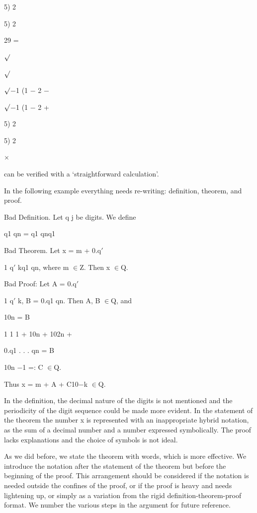 \documentclass[11pt]{article}
\theoremstyle{plain}
\theoremstyle{definition}
\begin{document}
5) 2

5) 2

29 =

$\surd$

$\surd$

$\surd$$-$1 (1 $-$ 2 $-$

$\surd$$-$1 (1 $-$ 2 +

5) 2

5) 2

$\times$

can be verified with a `straightforward calculation'.

In the following example everything needs re-writing: definition, theorem, and proof.

Bad Definition. Let q j be digits. We define

q1 \textperiodcentered{} \textperiodcentered{} \textperiodcentered{} qn = q1 \textperiodcentered{} \textperiodcentered{} \textperiodcentered{} qnq1 \textperiodcentered{} \textperiodcentered{} \textperiodcentered{}

Bad Theorem. Let x = m + 0.q$'$

1 \textperiodcentered{} \textperiodcentered{} \textperiodcentered{} q$'$ kq1 \textperiodcentered{} \textperiodcentered{} \textperiodcentered{} qn, where m $\in$Z. Then x $\in$Q.

Bad Proof: Let A = 0.q$'$

1 \textperiodcentered{} \textperiodcentered{} \textperiodcentered{} q$'$ k, B = 0.q1 \textperiodcentered{} \textperiodcentered{} \textperiodcentered{} qn. Then A, B $\in$Q, and

10n = B

1 1 1 + 10n + 102n + \textperiodcentered{} \textperiodcentered{} \textperiodcentered{}

0.q1 . . . qn = B

10n $-$1 =: C $\in$Q.

Thus x = m + A + C10$-$k $\in$Q. 

In the definition, the decimal nature of the digits is not mentioned and the periodicity of the digit sequence could be made more evident. In the statement of the theorem the number x is represented with an inappropriate hybrid notation, as the sum of a decimal number and a number expressed symbolically. The proof lacks explanations and the choice of symbols is not ideal.

As we did before, we state the theorem with words, which is more effective. We introduce the notation after the statement of the theorem but before the beginning of the proof. This arrangement should be considered if the notation is needed outside the confines of the proof, or if the proof is heavy and needs lightening up, or simply as a variation from the rigid definition-theorem-proof format. We number the various steps in the argument for future reference.
\end{document}
